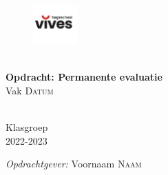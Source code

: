 \begin{titlepage}
\begin{center}

\begin{figure}[H]
  \centering
  \includegraphics[width=0.15\textwidth]{./lists/images/logo.png}
  \label{figure:vives-logo}
\end{figure}



\HRule \\[0.4cm]
{ \LARGE \bfseries Opdracht: Permanente evaluatie}\\[0.4cm]
{Vak \textsc{Datum}}\\[0.2cm]

\HRule \\[1.5cm]

\vfill

\begin{minipage}{0.49\textwidth}
\begin{flushleft} \large
Klasgroep\\
2022-2023\\
\end{flushleft}
\end{minipage}
\begin{minipage}{0.49\textwidth}
\begin{flushright} \large
\emph{Opdrachtgever:}
Voornaam \textsc{Naam}\\
\end{flushright}
\end{minipage}

\end{center}
\end{titlepage}
